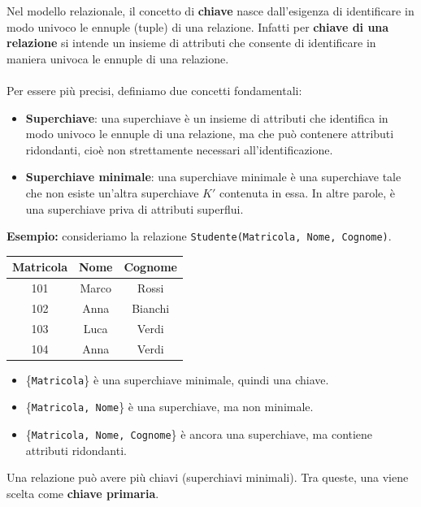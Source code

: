 \documentclass[a4paper,12pt]{article}
\begin{document}
Nel modello relazionale, il concetto di \textbf{chiave} nasce dall’esigenza di identificare in modo univoco le ennuple (tuple) di una relazione. Infatti per \textbf{chiave di una relazione} si intende un insieme di attributi che consente di identificare in maniera univoca le ennuple di una relazione.\mbox{}\\\\
Per essere più precisi, definiamo due concetti fondamentali:
\begin{itemize}
    
    \item \textbf{Superchiave}: una superchiave è un insieme di attributi che identifica in modo univoco le ennuple di una relazione, ma che può contenere attributi ridondanti, cioè non strettamente necessari all’identificazione.
    
    \item \textbf{Superchiave minimale}: una superchiave minimale è una superchiave tale che non esiste un’altra superchiave \(K'\) contenuta in essa.
    In altre parole, è una superchiave priva di attributi superflui.
\end{itemize}

\textbf{Esempio:} consideriamo la relazione \texttt{Studente(Matricola, Nome, Cognome)}.


\begin{center}
\begin{tabular}{|c|c|c|}
\hline
\textbf{Matricola} & \textbf{Nome} & \textbf{Cognome} \\
\hline
101 & Marco & Rossi \\
102 & Anna & Bianchi \\
103 & Luca & Verdi \\
104 & Anna & Verdi \\
\hline
\end{tabular}
\end{center}
\begin{itemize}
    \item \{\texttt{Matricola}\} è una superchiave minimale, quindi una chiave.
    \item \{\texttt{Matricola, Nome}\} è una superchiave, ma non minimale.
    \item \{\texttt{Matricola, Nome, Cognome}\} è ancora una superchiave, ma contiene attributi ridondanti.
\end{itemize}
Una relazione può avere più chiavi (superchiavi minimali). Tra queste, una viene scelta come \textbf{chiave primaria}.
\end{document}
